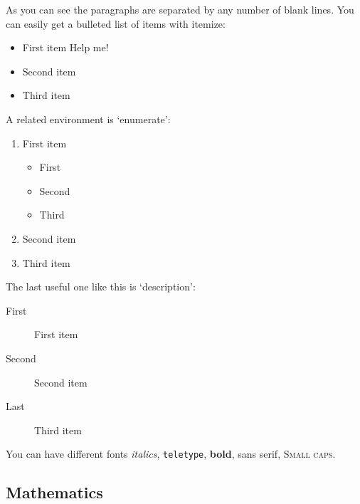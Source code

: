 \documentclass[11pt]{article}
\begin{document}
As you can see the paragraphs are separated by any number of  blank lines.
You can easily get a bulleted list of items with itemize:
\begin{itemize}
\item First item Help me!
\item Second item
\item Third item
\end{itemize}
A related environment is `enumerate':
\begin{enumerate}
\item First item
  \begin{itemize}
  \item First
  \item Second 
  \item Third
  \end{itemize}
\item Second item
\item Third item
\end{enumerate}
The last useful one like this is `description':
\begin{description}
\item[First] First item
\item[Second] Second item
\item[Last] Third item
\end{description}


You can have different fonts \textit{italics}, \texttt{teletype},
\textbf{bold}, \textsf{sans serif}, \textsc{Small caps}.


\subsection{Mathematics}
\label{sec:maths2}
\end{document}
